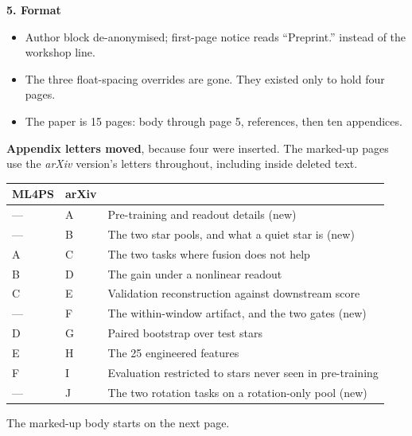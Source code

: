 \documentclass[10pt]{article}
\begin{document}
\textbf{5. Format}

\begin{itemize}[leftmargin=*, itemsep=2pt]
\item Author block de-anonymised; first-page notice reads ``Preprint.'' instead of the workshop line.
\item The three float-spacing overrides are gone. They existed only to hold four pages.
\item The paper is 15 pages: body through page 5, references, then ten appendices.
\end{itemize}

\textbf{Appendix letters moved}, because four were inserted. The marked-up pages use the
\emph{arXiv} version's letters throughout, including inside deleted text.

\begin{center}
\begin{tabular}{lll}
\toprule
ML4PS & arXiv & \\
\midrule
--- & A & Pre-training and readout details (new) \\
--- & B & The two star pools, and what a quiet star is (new) \\
A & C & The two tasks where fusion does not help \\
B & D & The gain under a nonlinear readout \\
C & E & Validation reconstruction against downstream score \\
--- & F & The within-window artifact, and the two gates (new) \\
D & G & Paired bootstrap over test stars \\
E & H & The 25 engineered features \\
F & I & Evaluation restricted to stars never seen in pre-training \\
--- & J & The two rotation tasks on a rotation-only pool (new) \\
\bottomrule
\end{tabular}
\end{center}

The marked-up body starts on the next page.
\end{document}
